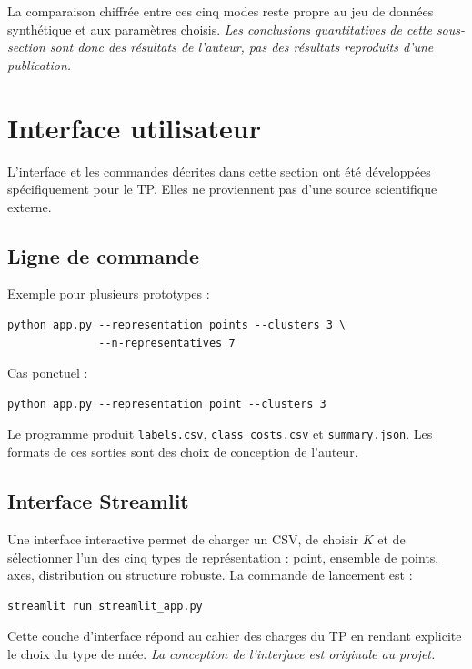 \documentclass[12pt,a4paper]{article}
\begin{document}
La comparaison chiffrée entre ces cinq modes reste propre au jeu de données synthétique et aux paramètres choisis. \textit{Les conclusions quantitatives de cette sous-section sont donc des résultats de l'auteur, pas des résultats reproduits d'une publication.}

\section{Interface utilisateur}

L'interface et les commandes décrites dans cette section ont été développées spécifiquement pour le TP. Elles ne proviennent pas d'une source scientifique externe.

\subsection{Ligne de commande}

Exemple pour plusieurs prototypes :

\begin{lstlisting}
python app.py --representation points --clusters 3 \
              --n-representatives 7
\end{lstlisting}

Cas ponctuel :

\begin{lstlisting}
python app.py --representation point --clusters 3
\end{lstlisting}

Le programme produit \texttt{labels.csv}, \texttt{class\_costs.csv} et \texttt{summary.json}. Les formats de ces sorties sont des choix de conception de l'auteur.

\subsection{Interface Streamlit}

Une interface interactive permet de charger un CSV, de choisir $K$ et de sélectionner l'un des cinq types de représentation : point, ensemble de points, axes, distribution ou structure robuste. La commande de lancement est :

\begin{lstlisting}
streamlit run streamlit_app.py
\end{lstlisting}

Cette couche d'interface répond au cahier des charges du TP en rendant explicite le choix du type de nuée. \textit{La conception de l'interface est originale au projet.}
\end{document}
